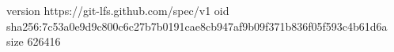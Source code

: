 version https://git-lfs.github.com/spec/v1
oid sha256:7c53a0e9d9c800c6c27b7b0191cae8cb947af9b09f371b836f05f593c4b61d6a
size 626416
